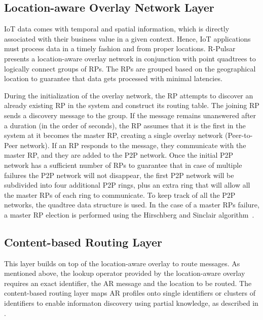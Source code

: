 \subsection{Location-aware Overlay Network Layer}

IoT data comes with temporal and spatial information, which is directly associated with their business value in a given context. Hence, IoT applications must process data in a timely fashion and from proper locations. R-Pulsar presents a location-aware overlay network in conjunction with point quadtrees to logically connect groups of RPs. The RPs are grouped based on the geographical location to guarantee that data gets processed with minimal latencies.

During the initialization of the overlay network, the RP attempts to discover an already existing RP in the system and construct its routing table. The joining RP sends a discovery message to the group. If the message remains unanswered after a duration (in the order of seconds), the RP assumes that it is the first in the system at it becomes the master RP, creating a single overlay network (Peer-to-Peer network).  If an RP responds to the message, they communicate with the master RP, and they are added to the P2P network. Once the initial P2P network has a sufficient number of RPs to guarantee that in case of multiple failures the P2P network will not disappear, the first P2P network will be subdivided into four additional P2P rings, plus an extra ring that will allow all the master RPs of each ring to communicate. To keep track of all the P2P networks, the quadtree data structure is used. In the case of a master RPs failure, a master RP election is performed using the Hirschberg and Sinclair algorithm~\cite{Hirschberg}. 


\subsection{Content-based Routing Layer}\label{sec:frameworkc}

This layer builds on top of the location-aware overlay to route messages. As mentioned above, the lookup operator provided by the location-aware overlay requires an exact identifier, the AR message and the location to be routed. The content-based routing layer maps AR profiles onto single identifiers or clusters of identifiers to enable informaton discovery using partial knowledge, as described in \cite{SCHMIDT2008962}.


